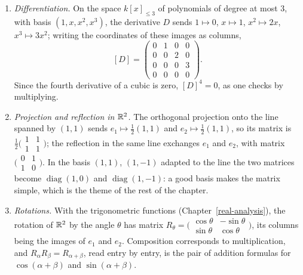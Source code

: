 \begin{example}\label{linear-algebra:example-matrices}
\begin{enumerate}
\item \emph{Differentiation.} On the space $k[x]_{\leq 3}$ of polynomials of degree at most $3$, with basis $(1, x, x^2, x^3)$, the derivative $D$ sends $1 \mapsto 0$, $x \mapsto 1$, $x^2 \mapsto 2x$,
$x^3 \mapsto 3x^2$; writing the coordinates of these images as columns,
\[
[D] = \begin{pmatrix}0 & 1 & 0 & 0\\ 0 & 0 & 2 & 0\\ 0 & 0 & 0 & 3\\ 0 & 0 & 0 & 0\end{pmatrix}.
\]
Since the fourth derivative of a cubic is zero, $[D]^4 = 0$, as one checks by multiplying.
\item \emph{Projection and reflection in $\mathbb{R}^2$.} The orthogonal projection onto the line spanned by $(1, 1)$ sends $e_1 \mapsto \frac12(1, 1)$ and $e_2 \mapsto \frac12(1, 1)$, so its matrix is
$\frac12\bigl(\begin{smallmatrix}1 & 1\\ 1 & 1\end{smallmatrix}\bigr)$; the reflection in the same line exchanges $e_1$ and $e_2$, with matrix $\bigl(\begin{smallmatrix}0 & 1\\ 1 & 0\end{smallmatrix}\bigr)$.
In the basis $(1, 1)$, $(1, -1)$ adapted to the line the two matrices become $\operatorname{diag}(1, 0)$ and $\operatorname{diag}(1, -1)$: a good basis makes the matrix simple, which is the theme of the
rest of the chapter.
\item \emph{Rotations.} With the trigonometric functions (Chapter~\ref{real-analysis}), the rotation of $\mathbb{R}^2$ by the angle $\theta$ has matrix
$R_\theta = \bigl(\begin{smallmatrix}\cos\theta & -\sin\theta\\ \sin\theta & \cos\theta\end{smallmatrix}\bigr)$, its columns being the images of $e_1$ and $e_2$. Composition corresponds to multiplication,
and $R_\alpha R_\beta = R_{\alpha+\beta}$, read entry by entry, is the pair of addition formulas for $\cos(\alpha + \beta)$ and $\sin(\alpha + \beta)$.
\end{enumerate}
\end{example}

